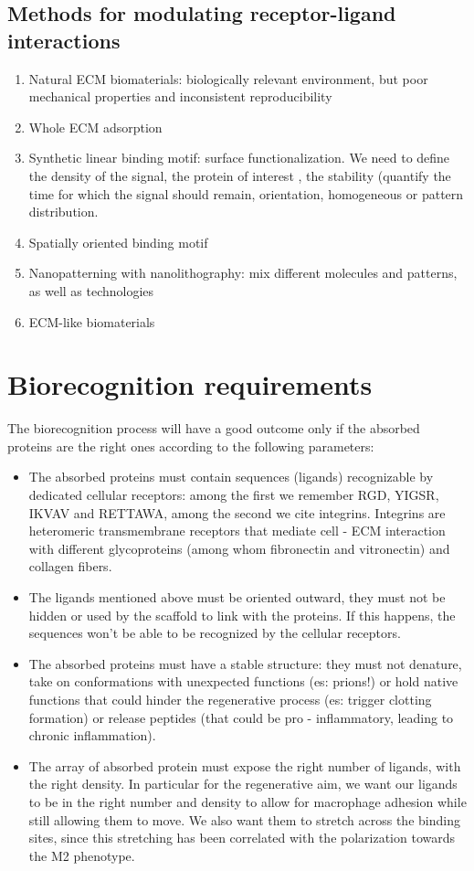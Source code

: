 \subsection{Methods for modulating receptor-ligand interactions}
\begin{enumerate}
\item Natural ECM biomaterials: biologically relevant environment, but poor mechanical properties and inconsistent reproducibility
\item Whole ECM adsorption
\item Synthetic linear binding motif: surface functionalization. We need to define the density of the signal, the protein of interest , the stability (quantify the time for which the signal should remain, orientation, homogeneous or pattern distribution.
\item Spatially oriented binding motif
\item Nanopatterning with nanolithography: mix different molecules and patterns, as well as technologies
\item ECM-like biomaterials
\end{enumerate}

\section{Biorecognition requirements}
The biorecognition process will have a good outcome only if the absorbed proteins are the right ones according to the following parameters:
\begin{itemize}
\item The absorbed proteins must contain sequences (ligands) recognizable by dedicated cellular receptors: among the first we remember RGD, YIGSR, IKVAV and RETTAWA, among the second we cite integrins.
Integrins are heteromeric transmembrane receptors that mediate cell - ECM interaction with different glycoproteins (among whom fibronectin and vitronectin) and collagen fibers.
\item The ligands mentioned above must be oriented outward, they must not be hidden or used by the scaffold to link with the proteins. If this happens, the sequences won’t be able to be recognized by the cellular receptors.
\item The absorbed proteins must have a stable structure: they must not denature, take on conformations with unexpected functions (es: prions!) or hold native functions that could hinder the regenerative process (es: trigger clotting formation) or release peptides (that could be pro - inflammatory, leading to chronic inflammation).
\item The array of absorbed protein must expose the right number of ligands, with the right density.  In particular for the regenerative aim, we want our ligands to be in the right number and density to allow for macrophage adhesion while still allowing them to move. We also want them to stretch across the binding sites, since this stretching has been correlated with the polarization towards the M2 phenotype.
\end{itemize}
